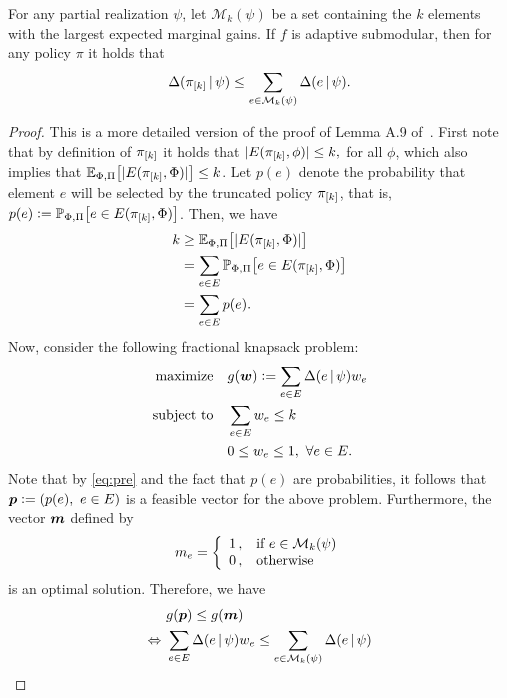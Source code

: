 \begin{lemma}\label{lem:mon_subm}
  For any partial realization $\psi$, let $\mathcal{M}_k(\psi)$ be a set containing the $k$ elements with the largest expected marginal gains.
  If $f$ is adaptive submodular, then for any policy $\pi$ it holds that
  \begin{align*}
    \Delta(\pi_{[k]}\,\vert\,\psi) \leq \sum_{e \in \mathcal{M}_k(\psi)} \Delta(e\,\vert\,\psi).
  \end{align*}
\end{lemma}
\begin{proof}
  This is a more detailed version of the proof of Lemma A.9 of~\citet{golovin11}.
  First note that by definition of $\pi_{[k]}$ it holds that $|E(\pi_{[k]}, \phi)| \leq k,$ for all $\phi$, which also implies that $\E[\Phi,\Pi]{|E(\pik, \Phi)|} \leq k$.
  Let $p(e)$ denote the probability that element $e$ will be selected by the truncated policy $\pi_{[k]}$, that is, $p(e) \defeq \P[\Phi,\Pi]{e \in E(\pik, \Phi)}$.
  Then, we have
  \begin{align}
    \label{eq:pre}
    \begin{split}
      k &\geq \E[\Phi, \Pi]{|E(\pik, \Phi)|}\\
        &= \sum_{e \in E}\P[\Phi,\Pi]{e \in E(\pik, \Phi)}\\
        &= \sum_{e \in E}p(e).
    \end{split}
  \end{align}
  Now, consider the following fractional knapsack problem:
  \begin{align*}
    \textrm{maximize} & \quad g(\bm{w}) \vcentcolon= \sum_{e \in E}\Delta(e\,\vert\,\psi)w_e\\
    \textrm{subject to} & \quad \sum_{e \in E}w_e \leq k\\
               & \quad 0 \leq w_e \leq 1,\ \forall e \in E.
  \end{align*}
  Note that by \eqref{eq:pre} and the fact that $p(e)$ are probabilities, it follows that $\*p \defeq \left(p(e),\ e \in E\right)$ is a feasible vector for the above problem.
  Furthermore, the vector $\bm{m}$ defined by
  \begin{align*}
    m_e = \twopartdefo{1}{e \in \mathcal{M}_k(\psi)}{0}
  \end{align*}
  is an optimal solution. 
  Therefore, we have
  \begin{align}\label{eq:knap}
                    &\ g(\bm{p}) \leq g(\bm{m}) \notag\\
    \Leftrightarrow &\ \sum_{e \in E}\Delta(e\,\vert\,\psi)w_e \leq \sum_{e \in \mathcal{M}_k(\psi)} \Delta(e\,\vert\,\psi)
  \end{align}
  

\end{proof}

